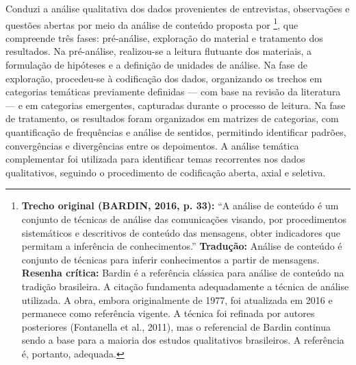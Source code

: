 Conduzi a análise qualitativa dos dados provenientes de entrevistas, observações e questões abertas por meio da análise de conteúdo proposta por \cite{BARDIN2016}\footnote{\textbf{Trecho original (BARDIN, 2016, p. 33):} ``A análise de conteúdo é um conjunto de técnicas de análise das comunicações visando, por procedimentos sistemáticos e descritivos de conteúdo das mensagens, obter indicadores que permitam a inferência de conhecimentos.'' \textbf{Tradução:} Análise de conteúdo é conjunto de técnicas para inferir conhecimentos a partir de mensagens. \textbf{Resenha crítica:} Bardin é a referência clássica para análise de conteúdo na tradição brasileira. A citação fundamenta adequadamente a técnica de análise utilizada. A obra, embora originalmente de 1977, foi atualizada em 2016 e permanece como referência vigente. A técnica foi refinada por autores posteriores (Fontanella et al., 2011), mas o referencial de Bardin continua sendo a base para a maioria dos estudos qualitativos brasileiros. A referência é, portanto, adequada.}, que compreende três fases: pré-análise, exploração do material e tratamento dos resultados. Na pré-análise, realizou-se a leitura flutuante dos materiais, a formulação de hipóteses e a definição de unidades de análise. Na fase de exploração, procedeu-se à codificação dos dados, organizando os trechos em categorias temáticas previamente definidas — com base na revisão da literatura — e em categorias emergentes, capturadas durante o processo de leitura. Na fase de tratamento, os resultados foram organizados em matrizes de categorias, com quantificação de frequências e análise de sentidos, permitindo identificar padrões, convergências e divergências entre os depoimentos. A análise temática complementar foi utilizada para identificar temas recorrentes nos dados qualitativos, seguindo o procedimento de codificação aberta, axial e seletiva.

